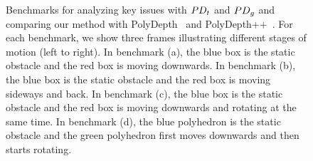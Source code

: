 \begin{figure}[!h]
\caption[Benchmarks for analyzing key issues with $\PDt$ and $\PDg$ computation and comparing our method with PolyDepth and PolyDepth++]
{Benchmarks for analyzing key issues with $\PDt$ and $\PDg$ and comparing our method with PolyDepth~\cite{Je:2012:PRP} and PolyDepth++~\cite{Tang:2012:IGP}. For each benchmark, we show three frames illustrating different stages of motion (left to right). In benchmark (a), the blue box is the static obstacle and the red box is moving downwards. In benchmark (b), the blue box is the static obstacle and the red box is moving sideways and back. In benchmark (c), the blue box is the static obstacle and the red box is moving downwards and rotating at the same time. In benchmark (d), the blue polyhedron is the static obstacle and the green polyhedron first moves downwards and then starts rotating.}\label{fig:2:analysis_benchmark}
\end{figure}

